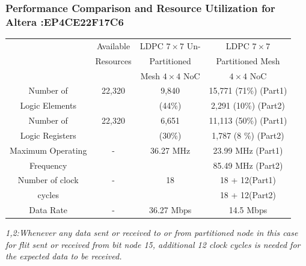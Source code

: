 \begin{frame}
\frametitle{Performance Comparison and Resource Utilization for Altera :EP4CE22F17C6} 
\tiny
\begin{table} [scale=0.6]
\begin{center}
{\begin{tabular}{|| c || c | c | c ||}
\hline
				& Available  	& LDPC $7\times7$ Un-   & LDPC $7\times7$ 			\\ 
				& Resources  	& Partitioned      	& Partitioned Mesh 				\\
				&		& Mesh $4\times4$ NoC 	& $4\times4$ NoC				\\ \hline
	Number of		& 22,320     	& 9,840      	      	& 15,771 (71\%) (Part1) 			\\ 
	Logic Elements		&		& (44\%)		& 2,291  (10\%) (Part2)				\\ \hline
	Number of 		& 22,320     	& 6,651	              	& 11,113 (50\%) (Part1)				\\ 
	Logic Registers		&		& (30\%) 	      	& 1,787  (8 \%) (Part2)				\\ \hline
	Maximum Operating	& -          	& 36.27 MHz           	& 23.99 MHz 	(Part1)				\\  
	Frequency		&            	&                     	& 85.49 MHz	(Part2)				\\ \hline
	Number of clock		& -          	& 18                  	& 18 + 12(Part1)\footnotemark		\\ 
	cycles			&		&			& 18 + 12(Part2)\footnotemark		\\ \hline
	Data Rate		& -		& 36.27 Mbps		& 14.5 Mbps      				\\ \hline
\end{tabular}}
\end{center}
\end{table}

\tiny
\textit{1,2:Whenever any data sent or received to or from partitioned node in this case for flit sent or received from bit node 15, additional 12 clock cycles is needed for the expected data to be received.}
\end{frame}


  
  
  
